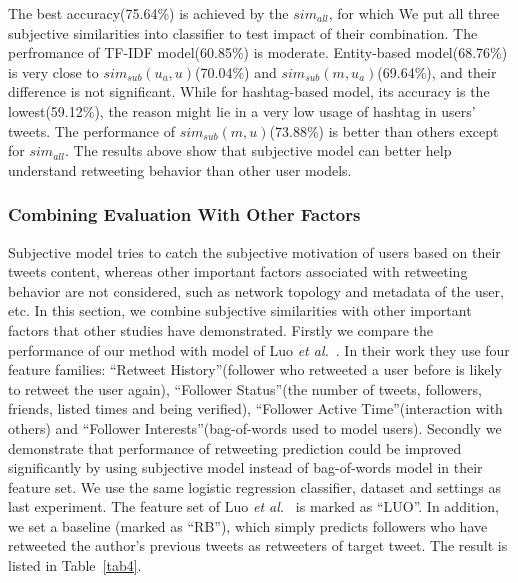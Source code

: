 \documentclass[letterpaper]{article}
\begin{document}
The best accuracy(75.64\%) is achieved by the $ sim_{all}  $, for which We put all three subjective similarities into classifier to test impact of their combination.
The perfromance of TF-IDF model(60.85\%) is moderate.  
Entity-based model(68.76\%) is very close to  $ sim_{sub}\left( u_{a},u \right)$(70.04\%) and $ sim_{sub}\left( m,u_{a} \right)  $(69.64\%), and their difference is not significant.
While for hashtag-based model, its accuracy is the lowest(59.12\%), the reason might lie in a very low usage of hashtag in users' tweets. 
The performance of $ sim_{sub} \left( m,u \right) $(73.88\%) is better than others except for $ sim_{all}  $.
The results above show that subjective model can better help understand retweeting behavior than other user models.

\subsubsection{Combining Evaluation With Other Factors}
\label{combining}
Subjective model tries to catch the subjective motivation of users based on their tweets content, whereas other important factors associated with retweeting behavior are not considered, such as network topology and metadata of the user, etc. 
In this section, we combine subjective similarities with other important factors that other studies have demonstrated. 
Firstly we compare the performance of our method with model of Luo \emph{et al.}~.
In their work they use four feature families: ``Retweet History''(follower who retweeted a user before is likely to retweet the user again), ``Follower Status''(the number of tweets, followers, friends, listed times and being verified), ``Follower Active Time''(interaction with others) and ``Follower Interests''(bag-of-words used to model users).
Secondly we demonstrate that performance of retweeting prediction could be improved significantly by using subjective model instead of bag-of-words model in their feature set. 
We use the same logistic regression classifier, dataset and settings as last experiment. The feature set of Luo \emph{et al.}~ is marked as ``LUO''.
In addition, we set a baseline (marked as ``RB''), which simply predicts followers who have retweeted the author's previous tweets as retweeters of target tweet. 
The result is listed in Table~\ref{tab4}.
\end{document}
